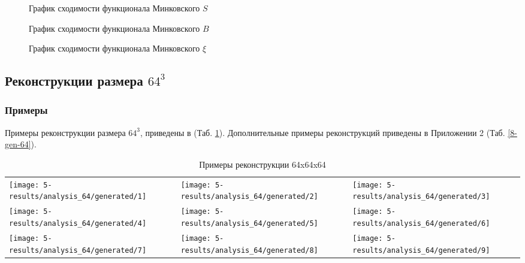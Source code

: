 		\begin{figure}[h]
			\caption{График сходимости функционала Минковского $S$}
			\label{S-plot}
		\end{figure}
	
		\begin{figure}[h]
			\caption{График сходимости функционала Минковского $B$}
			\label{B-plot}
		\end{figure}
	
		\begin{figure}[h]
			\caption{График сходимости функционала Минковского $\xi$}
			\label{Xi-plot}
		\end{figure}	
		
	
	\subsection{Реконструкции размера $64^3$}
		\subsubsection{Примеры}
			Примеры реконструкции размера $64^3$, приведены в (Таб. \ref{5-gen-64}). Дополнительные примеры реконструкций приведены в Приложении 2 (Таб. \ref{8-gen-64}).
			
			\begin{table}[h]
				\centering
				\begin{tabular}{p{5cm} p{5cm} p{5cm}}
					\toprule
					\texttt{[image: 5-results/analysis\_64/generated/1]}
					&
					\texttt{[image: 5-results/analysis\_64/generated/2]}
					&
					\texttt{[image: 5-results/analysis\_64/generated/3]}
					\\
					\texttt{[image: 5-results/analysis\_64/generated/4]}
					&
					\texttt{[image: 5-results/analysis\_64/generated/5]}
					&
					\texttt{[image: 5-results/analysis\_64/generated/6]}
					\\
					\texttt{[image: 5-results/analysis\_64/generated/7]}
					&
					\texttt{[image: 5-results/analysis\_64/generated/8]}
					&
					\texttt{[image: 5-results/analysis\_64/generated/9]}
					\\
					\bottomrule
				\end{tabular}
				\caption{Примеры реконструкции 64x64x64}
				\label{5-gen-64}
			\end{table} 
		
